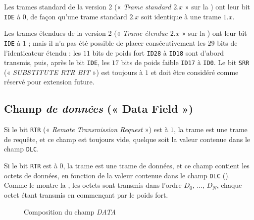 Les trames standard de la version 2 (« \emph{Trame standard $2.x$} » sur la ) ont leur bit \texttt{IDE} à $0$, de façon qu'une trame standard $2.x$ soit identique à une trame $1.x$.

Les trames étendues de la version 2 (« \emph{Trame étendue $2.x$} » sur la ) ont leur bit \texttt{IDE} à $1$ ; mais il n'a pas été possible de placer consécutivement les $29$ bits de l'identicateur étendu : les $11$ bits de poids fort \texttt{ID28} à \texttt{ID18} sont d'abord transmis, puis, après le bit \texttt{IDE}, les $17$ bits de poids faible \texttt{ID17} à \texttt{ID0}. Le bit \texttt{SRR} (« \emph{SUBSTITUTE RTR BIT} ») est toujours à $1$  et doit être considéré comme réservé pour extension future.






\subsection{Champ \emph{de données} (« Data Field »)}

Si le bit \texttt{RTR} (« \emph{Remote Transmission Request} ») est à $1$, la trame est une trame de requête, et ce champ est toujours vide, quelque soit la valeur contenue dans le champ \texttt{DLC}.

Si le bit \texttt{RTR} est à $0$, la trame est une trame de données, et ce champ contient les octets de données, en fonction de la valeur contenue dans le champ \texttt{DLC} (). Comme le montre la , les octets sont transmis dans l'ordre \texttt{$D_0$}, ..., \texttt{$D_N$}, chaque octet étant transmis en commençant par le poids fort.



\begin{figure}[h]
  \centering
  \caption{Composition du champ \emph{DATA}}
\end{figure}





